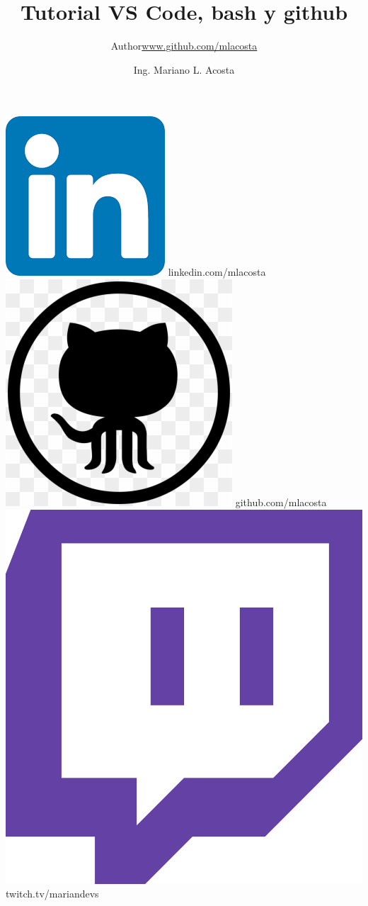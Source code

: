 \documentclass{beamer}
\title{Tutorial VS Code, bash y github}
\author{\texorpdfstring{Author\newline\url{www.github.com/mlacosta}}{Author}}
\author{Ing. Mariano L. Acosta}
\begin{document}
\begin{frame}[plain]
    \maketitle
    	\begin{center}
    		\includegraphics[scale=.025]{img/icons/linkedin.png}{ \tiny linkedin.com/mlacosta} \\
    		\includegraphics[scale=.02]{img/icons/github.png}{ \tiny github.com/mlacosta} \\
    		\includegraphics[scale=.006]{img/icons/twitch.png}{ \tiny twitch.tv/mariandevs} \\

\end{center}
\end{frame}
\end{document}
